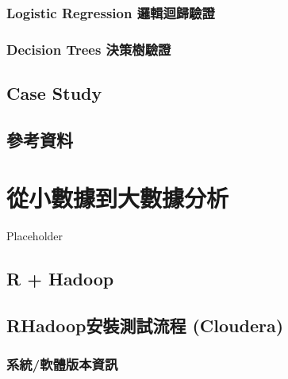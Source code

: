 \documentclass[
]{book}
\begin{document}
\hypertarget{logistic-regression-ux908fux8f2fux8ff4ux6b78ux9a57ux8b49}{%
\subsection{Logistic Regression 邏輯迴歸驗證}\label{logistic-regression-ux908fux8f2fux8ff4ux6b78ux9a57ux8b49}}

\hypertarget{decision-trees-ux6c7aux7b56ux6a39ux9a57ux8b49}{%
\subsection{Decision Trees 決策樹驗證}\label{decision-trees-ux6c7aux7b56ux6a39ux9a57ux8b49}}

\hypertarget{case-study}{%
\section{Case Study}\label{case-study}}

\hypertarget{ux53c3ux8003ux8cc7ux6599}{%
\section{參考資料}\label{ux53c3ux8003ux8cc7ux6599}}

\hypertarget{big}{%
\chapter{從小數據到大數據分析}\label{big}}

Placeholder

\hypertarget{r-hadoop}{%
\section{R + Hadoop}\label{r-hadoop}}

\hypertarget{rhadoopux5b89ux88ddux6e2cux8a66ux6d41ux7a0b-cloudera}{%
\section{RHadoop安裝測試流程 (Cloudera)}\label{rhadoopux5b89ux88ddux6e2cux8a66ux6d41ux7a0b-cloudera}}

\hypertarget{ux7cfbux7d71ux8edfux9ad4ux7248ux672cux8cc7ux8a0a}{%
\subsection{系統/軟體版本資訊}\label{ux7cfbux7d71ux8edfux9ad4ux7248ux672cux8cc7ux8a0a}}
\end{document}
